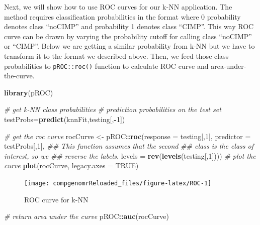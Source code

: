 \documentclass[12pt,]{krantz}
\newenvironment{Shaded}{\begin{snugshade}}{\end{snugshade}}
\newcommand{\CommentTok}[1]{\textcolor[rgb]{0.56,0.35,0.01}{\textit{#1}}}
\newcommand{\DataTypeTok}[1]{\textcolor[rgb]{0.13,0.29,0.53}{#1}}
\newcommand{\DecValTok}[1]{\textcolor[rgb]{0.00,0.00,0.81}{#1}}
\newcommand{\KeywordTok}[1]{\textcolor[rgb]{0.13,0.29,0.53}{\textbf{#1}}}
\newcommand{\NormalTok}[1]{#1}
\newcommand{\OperatorTok}[1]{\textcolor[rgb]{0.81,0.36,0.00}{\textbf{#1}}}
\newcommand{\OtherTok}[1]{\textcolor[rgb]{0.56,0.35,0.01}{#1}}
\newcommand{\StringTok}[1]{\textcolor[rgb]{0.31,0.60,0.02}{#1}}
\begin{document}
Next, we will show how to use ROC curves for our k-NN application. The method requires classification probabilities in the format where 0 probability denotes class ``noCIMP'' and probability 1 denotes class ``CIMP''. This way ROC curve can be drawn by varying the probability cutoff for calling class ``noCIMP'' or ``CIMP''. Below we are getting a similar probability from k-NN but we have to transform it to the format we described above. Then, we feed those class probabilities to \texttt{pROC::roc()} function to calculate ROC curve and area-under-the-curve.

\begin{Shaded}
\begin{Highlighting}[]
\KeywordTok{library}\NormalTok{(pROC)}

\CommentTok{# get k-NN class probabilities}
\CommentTok{# prediction probabilities on the test set}
\NormalTok{testProbs=}\KeywordTok{predict}\NormalTok{(knnFit,testing[,}\OperatorTok{-}\DecValTok{1}\NormalTok{])}

\CommentTok{# get the roc curve}
\NormalTok{rocCurve <-}\StringTok{ }\NormalTok{pROC}\OperatorTok{::}\KeywordTok{roc}\NormalTok{(}\DataTypeTok{response =}\NormalTok{ testing[,}\DecValTok{1}\NormalTok{],}
                \DataTypeTok{predictor =}\NormalTok{ testProbs[,}\DecValTok{1}\NormalTok{],}
              \CommentTok{## This function assumes that the second}
              \CommentTok{## class is the class of interest, so we}
              \CommentTok{## reverse the labels.}
              \DataTypeTok{levels =} \KeywordTok{rev}\NormalTok{(}\KeywordTok{levels}\NormalTok{(testing[,}\DecValTok{1}\NormalTok{])))}
\CommentTok{# plot the curve}
\KeywordTok{plot}\NormalTok{(rocCurve, }\DataTypeTok{legacy.axes =} \OtherTok{TRUE}\NormalTok{)}
\end{Highlighting}
\end{Shaded}

\begin{figure}

{\centering \texttt{[image: compgenomrReloaded\_files/figure-latex/ROC-1]} 

}

\caption{ROC curve for k-NN}\label{fig:ROC}
\end{figure}

\begin{Shaded}
\begin{Highlighting}[]
\CommentTok{# return area under the curve}
\NormalTok{pROC}\OperatorTok{::}\KeywordTok{auc}\NormalTok{(rocCurve)}
\end{Highlighting}
\end{Shaded}
\end{document}
